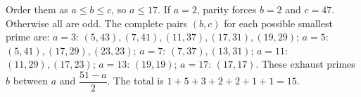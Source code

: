 Order them as $a\le b\le c$, so $a\le17$. If $a=2$, parity forces $b=2$ and $c=47$. Otherwise all are odd. The complete pairs $(b,c)$ for each possible smallest prime are: $a=3$: $(5,43),(7,41),(11,37),(17,31),(19,29)$; $a=5$: $(5,41),(17,29),(23,23)$; $a=7$: $(7,37),(13,31)$; $a=11$: $(11,29),(17,23)$; $a=13$: $(19,19)$; $a=17$: $(17,17)$. These exhaust primes $b$ between $a$ and $\dfrac{51-a}{2}$. The total is $1+5+3+2+2+1+1=\boxed{15}$.

